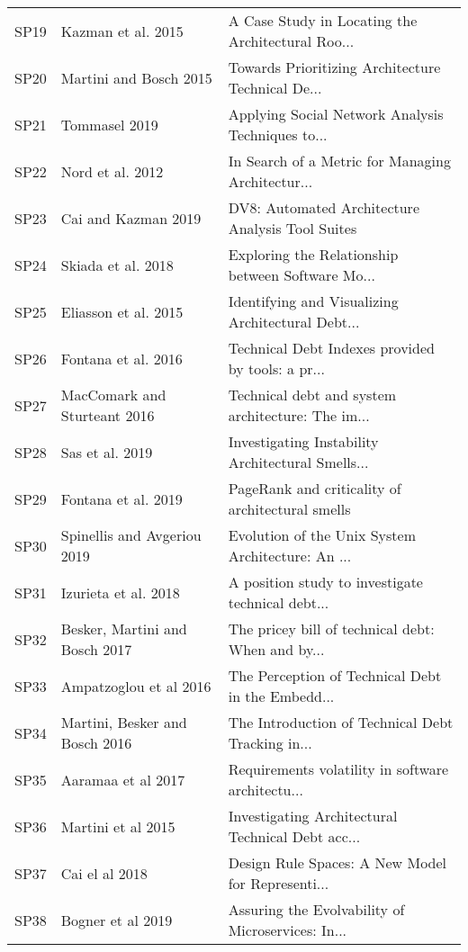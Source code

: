\begin{tabular}{lll}
 SP19 &              Kazman et al. 2015 &  A Case Study in Locating the Architectural Roo... \\
 SP20 &          Martini and Bosch 2015 &  Towards Prioritizing Architecture Technical De... \\
 SP21 &                   Tommasel 2019 &  Applying Social Network Analysis Techniques to... \\
 SP22 &                Nord et al. 2012 &  In Search of a Metric for Managing Architectur... \\
 SP23 &             Cai and Kazman 2019 &   DV8: Automated Architecture Analysis Tool Suites \\
 SP24 &              Skiada et al. 2018 &  Exploring the Relationship between Software Mo... \\
 SP25 &            Eliasson et al. 2015 &  Identifying and Visualizing Architectural Debt... \\
 SP26 &             Fontana et al. 2016 &  Technical Debt Indexes provided by tools: a pr... \\
 SP27 &    MacComark and Sturteant 2016 &  Technical debt and system architecture: The im... \\
 SP28 &                 Sas et al. 2019 &  Investigating Instability Architectural Smells... \\
 SP29 &             Fontana et al. 2019 &   PageRank and criticality of architectural smells \\
 SP30 &     Spinellis and Avgeriou 2019 &  Evolution of the Unix System Architecture: An ... \\
 SP31 &            Izurieta et al. 2018 &  A position study to investigate technical debt... \\
 SP32 &  Besker, Martini and Bosch 2017 &  The pricey bill of technical debt: When and by... \\
 SP33 &          Ampatzoglou et al 2016 &  The Perception of Technical Debt in the Embedd... \\
 SP34 &  Martini, Besker and Bosch 2016 &  The Introduction of Technical Debt Tracking in... \\
 SP35 &              Aaramaa et al 2017 &  Requirements volatility in software architectu... \\
 SP36 &              Martini et al 2015 &  Investigating Architectural Technical Debt acc... \\
 SP37 &                  Cai el al 2018 &  Design Rule Spaces: A New Model for Representi... \\
 SP38 &               Bogner et al 2019 &  Assuring the Evolvability of Microservices: In... \\

\end{tabular}
